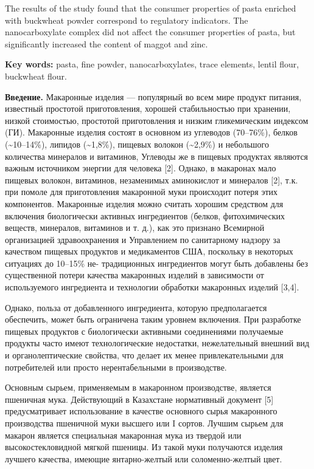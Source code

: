 The results of the study found that the consumer properties of pasta
enriched with buckwheat powder correspond to regulatory indicators. The
nanocarboxylate complex did not affect the consumer properties of pasta,
but significantly increased the content of maggot and zinc.

{\bfseries Key words:} pasta, fine powder, nanocarboxylates, trace
elements, lentil flour, buckwheat flour.

{\bfseries Введение.} Макаронные изделия --- популярный во всем мире
продукт питания, известный простотой приготовления, хорошей
стабильностью при хранении, низкой стоимостью, простотой приготовления и
низким гликемическим индексом (ГИ). Макаронные изделия состоят в
основном из углеводов (70--76\%), белков (\textasciitilde10--14\%),
липидов (\textasciitilde1,8\%), пищевых волокон (\textasciitilde2,9\%) и
небольшого количества минералов и витаминов, Углеводы же в пищевых
продуктах являются важным источником энергии для человека {[}2{]}.
Однако, в макаронах мало пищевых волокон, витаминов, незаменимых
аминокислот и минералов {[}2{]}, т.к. при помоле для приготовления
макаронной муки происходит потеря этих компонентов. Макаронные изделия
можно считать хорошим средством для включения биологически активных
ингредиентов (белков, фитохимических веществ, минералов, витаминов и т.
д.), как это признано Всемирной организацией здравоохранения и
Управлением по санитарному надзору за качеством пищевых продуктов и
медикаментов США, поскольку в некоторых ситуациях до 10--15\% не-
традиционных ингредиентов могут быть добавлены без существенной потери
качества макаронных изделий в зависимости от используемого ингредиента и
технологии обработки макаронных изделий {[}3,4{]}.

Однако, польза от добавленного ингредиента, которую предполагается
обеспечить, может быть ограничена таким уровнем включения. При
разработке пищевых продуктов с биологически активными соединениями
получаемые продукты часто имеют технологические недостатки,
нежелательный внешний вид и органолептические свойства, что делает их
менее привлекательными для потребителей или просто нерентабельными в
производстве.

Основным сырьем, применяемым в макаронном производстве, является
пшеничная мука. Действующий в Казахстане нормативный документ {[}5{]}
предусматривает использование в качестве основного сырья макаронного
производства пшеничной муки высшего или I сортов. Лучшим сырьем для
макарон является специальная макаронная мука из твердой или
высокостекловидной мягкой пшеницы. Из такой муки получаются изделия
лучшего качества, имеющие янтарно-желтый или соломенно-желтый цвет.

